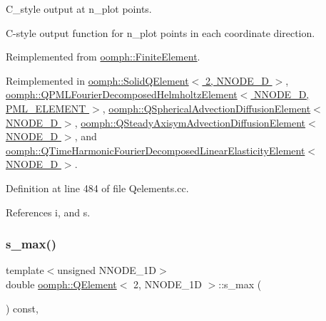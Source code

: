 C\+\_\+style output at n\+\_\+plot points. 

C-\/style output function for n\+\_\+plot points in each coordinate direction. 

Reimplemented from \hyperlink{classoomph_1_1FiniteElement_adfaee690bb0608f03320eeb9d110d48c}{oomph\+::\+Finite\+Element}.



Reimplemented in \hyperlink{classoomph_1_1SolidQElement_3_012_00_01NNODE__1D_01_4_a600c5d98f117ac64a07b95a75d06cf03}{oomph\+::\+Solid\+Q\+Element$<$ 2, N\+N\+O\+D\+E\+\_\+D $>$}, \hyperlink{classoomph_1_1QPMLFourierDecomposedHelmholtzElement_ad0cc7d26df69a746a4b667ee447d4a7a}{oomph\+::\+Q\+P\+M\+L\+Fourier\+Decomposed\+Helmholtz\+Element$<$ N\+N\+O\+D\+E\+\_\+D, P\+M\+L\+\_\+\+E\+L\+E\+M\+E\+N\+T $>$}, \hyperlink{classoomph_1_1QSphericalAdvectionDiffusionElement_a16854bbf99abd7b8512474992a29f72b}{oomph\+::\+Q\+Spherical\+Advection\+Diffusion\+Element$<$ N\+N\+O\+D\+E\+\_\+D $>$}, \hyperlink{classoomph_1_1QSteadyAxisymAdvectionDiffusionElement_ad4d1e0792228024edcb5e8d188fbe326}{oomph\+::\+Q\+Steady\+Axisym\+Advection\+Diffusion\+Element$<$ N\+N\+O\+D\+E\+\_\+D $>$}, and \hyperlink{classoomph_1_1QTimeHarmonicFourierDecomposedLinearElasticityElement_aa965a2e2d7f942f43e5e668b9111e9e0}{oomph\+::\+Q\+Time\+Harmonic\+Fourier\+Decomposed\+Linear\+Elasticity\+Element$<$ N\+N\+O\+D\+E\+\_\+D $>$}.



Definition at line 484 of file Qelements.\+cc.



References i, and s.

\mbox{\label{classoomph_1_1QElement_3_012_00_01NNODE__1D_01_4_ad14a113b809f3b407c63f6690ebc6c6d}} 
\subsubsection{\texorpdfstring{s\+\_\+max()}{s\_max()}}
{\footnotesize\ttfamily template$<$unsigned N\+N\+O\+D\+E\+\_\+1D$>$ \\
double \hyperlink{classoomph_1_1QElement}{oomph\+::\+Q\+Element}$<$ 2, N\+N\+O\+D\+E\+\_\+1D $>$\+::s\+\_\+max (\begin{DoxyParamCaption}{ }\end{DoxyParamCaption}) const\hspace{0.3cm}{\ttfamily [inline]}, {\ttfamily [virtual]}}




